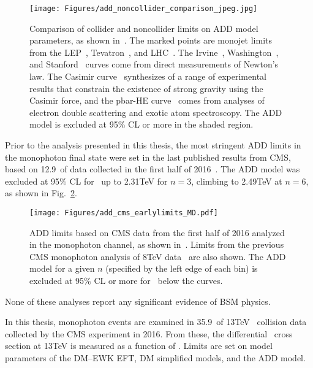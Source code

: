 \begin{figure}[hbtp]
  \begin{center}
    \texttt{[image: Figures/add\_noncollider\_comparison\_jpeg.jpg]}
    \caption{
      Comparison of collider and noncollider limits on ADD model parameters, as shown in~\cite{ref:0264-9381/32/3/033001}.
      The marked points are monojet limits from the LEP~\cite{ref:9789812702227_0266}, Tevatron~\cite{ref:PhysRevLett.101.181602}, and LHC~\cite{ref:j.physletb.2011.10.006, ref:PhysRevLett.110.011802, ref:0264-9381/32/3/033001}.
      The Irvine~\cite{ref:PhysRevD.32.3084, ref:PhysRevLett.44.1645}, Washington~\cite{ref:PhysRevLett.98.021101}, and Stanford~\cite{ref:PhysRevD.78.022002} curves come from direct measurements of Newton's law.
      The Casimir curve~\cite{ref:0264-9381/32/3/033001} synthesizes of a range of  experimental results that constrain the existence of strong gravity using the Casimir force,
      and the pbar-HE curve~\cite{ref:epjconf/20146605021, ref:0264-9381/32/3/033001} comes from analyses of electron double scattering and exotic atom spectroscopy.
      The ADD model is excluded at 95\% CL or more in the shaded region.
    }
    \label{fig:add_noncollider_comparison}
  \end{center}
\end{figure}

Prior to the analysis presented in this thesis, the most stringent ADD limits in the monophoton final state were set in the last published results from CMS,
based on 12.9\fbinv\ of data collected in the first half of 2016~\cite{ref:JHEP10(2017)073}. The ADD model was excluded at 95\% CL for \mD\ up to 2.31\unit{TeV}
for $n = 3$, climbing to 2.49\unit{TeV} at $n = 6$, as shown in Fig.~\ref{fig:add_cms_earlylimits_MD}.

\begin{figure}[hbtp]
  \begin{center}
    \texttt{[image: Figures/add\_cms\_earlylimits\_MD.pdf]}
    \caption{
    ADD limits based on CMS data from the first half of 2016 analyzed in the monophoton channel, as shown in~\cite{ref:JHEP10(2017)073}.
    Limits from the previous CMS monophoton analysis of 8\unit{TeV} data~\cite{ref:j.physletb.2016.01.057} are also shown.
    The ADD model for a given $n$ (specified by the left edge of each bin) is excluded at 95\% CL or more for \mD\ below the curves.
    }
    \label{fig:add_cms_earlylimits_MD}
  \end{center}
\end{figure}

None of these analyses report any significant evidence of BSM physics.

In this thesis, monophoton events are examined in 35.9\fbinv\ of 13\unit{TeV} \Pp\Pp\ collision data collected by the CMS experiment in 2016.
From these, the differential \zinvg\ cross section at 13\unit{TeV} is measured as a function of \pTgamma. Limits are set on model
parameters of the DM--EWK EFT, DM simplified models, and the ADD model.